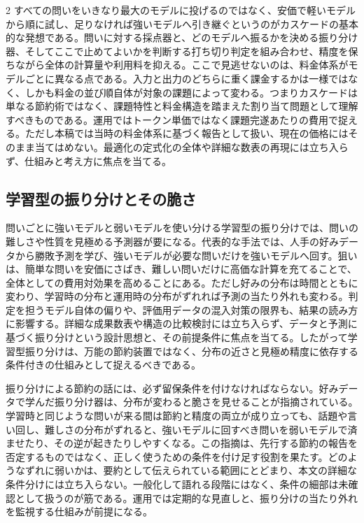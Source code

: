 \documentclass[lualatex,a4paper,10pt]{jlreq}
\begin{document}
\begin{multicols}{2}
\raggedcolumns
すべての問いをいきなり最大のモデルに投げるのではなく、安価で軽いモデルから順に試し、足りなければ強いモデルへ引き継ぐというのがカスケードの基本的な発想である\autocite{frugalgpt}。問いに対する採点器と、どのモデルへ振るかを決める振り分け器、そしてここで止めてよいかを判断する打ち切り判定を組み合わせ、精度を保ちながら全体の計算量や利用料を抑える。ここで見逃せないのは、料金体系がモデルごとに異なる点である。入力と出力のどちらに重く課金するかは一様ではなく、しかも料金の並び順自体が対象の課題によって変わる。つまりカスケードは単なる節約術ではなく、課題特性と料金構造を踏まえた割り当て問題として理解すべきものである。運用ではトークン単価ではなく課題完遂あたりの費用で捉える。ただし本稿では当時の料金体系に基づく報告として扱い、現在の価格にはそのまま当てはめない。最適化の定式化の全体や詳細な数表の再現には立ち入らず、仕組みと考え方に焦点を当てる。

\subsection{学習型の振り分けとその脆さ}
問いごとに強いモデルと弱いモデルを使い分ける学習型の振り分けでは、問いの難しさや性質を見極める予測器が要になる。代表的な手法では、人手の好みデータから勝敗予測を学び、強いモデルが必要な問いだけを強いモデルへ回す\autocite{routellm}。狙いは、簡単な問いを安価にさばき、難しい問いだけに高価な計算を充てることで、全体としての費用対効果を高めることにある。ただし好みの分布は時間とともに変わり、学習時の分布と運用時の分布がずれれば予測の当たり外れも変わる。判定を担うモデル自体の偏りや、評価用データの混入対策の限界も、結果の読み方に影響する。詳細な成果数表や構造の比較検討には立ち入らず、データと予測に基づく振り分けという設計思想と、その前提条件に焦点を当てる。したがって学習型振り分けは、万能の節約装置ではなく、分布の近さと見極め精度に依存する条件付きの仕組みとして捉えるべきである。

振り分けによる節約の話には、必ず留保条件を付けなければならない。好みデータで学んだ振り分け器は、分布が変わると脆さを見せることが指摘されている\autocite{fragility}。学習時と同じような問いが来る間は節約と精度の両立が成り立っても、話題や言い回し、難しさの分布がずれると、強いモデルに回すべき問いを弱いモデルで済ませたり、その逆が起きたりしやすくなる。この指摘は、先行する節約の報告を否定するものではなく、正しく使うための条件を付け足す役割を果たす。どのようなずれに弱いかは、要約として伝えられている範囲にとどまり、本文の詳細な条件分けには立ち入らない。一般化して語れる段階にはなく、条件の細部は未確認として扱うのが筋である。運用では定期的な見直しと、振り分けの当たり外れを監視する仕組みが前提になる。


\end{multicols}
\end{document}
